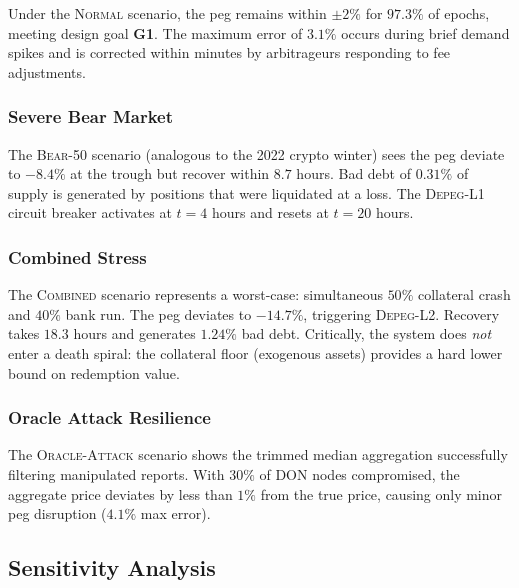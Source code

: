 \documentclass[11pt,a4paper]{article}
\begin{document}
Under the \textsc{Normal} scenario, the peg remains within $\pm 2\%$ for $97.3\%$ of epochs, meeting design goal \textbf{G1}.
The maximum error of $3.1\%$ occurs during brief demand spikes and is corrected within minutes by arbitrageurs responding to fee adjustments.

\subsubsection{Severe Bear Market}

The \textsc{Bear-50} scenario (analogous to the 2022 crypto winter) sees the peg deviate to $-8.4\%$ at the trough but recover within $8.7$ hours.
Bad debt of $0.31\%$ of supply is generated by positions that were liquidated at a loss.
The \textsc{Depeg-L1} circuit breaker activates at $t = 4$ hours and resets at $t = 20$ hours.

\subsubsection{Combined Stress}

The \textsc{Combined} scenario represents a worst-case: simultaneous $50\%$ collateral crash and $40\%$ bank run.
The peg deviates to $-14.7\%$, triggering \textsc{Depeg-L2}.
Recovery takes $18.3$ hours and generates $1.24\%$ bad debt.
Critically, the system does \emph{not} enter a death spiral: the collateral floor (exogenous assets) provides a hard lower bound on redemption value.

\subsubsection{Oracle Attack Resilience}

The \textsc{Oracle-Attack} scenario shows the trimmed median aggregation successfully filtering manipulated reports.
With $30\%$ of DON nodes compromised, the aggregate price deviates by less than $1\%$ from the true price, causing only minor peg disruption ($4.1\%$ max error).

\subsection{Sensitivity Analysis}
\end{document}
